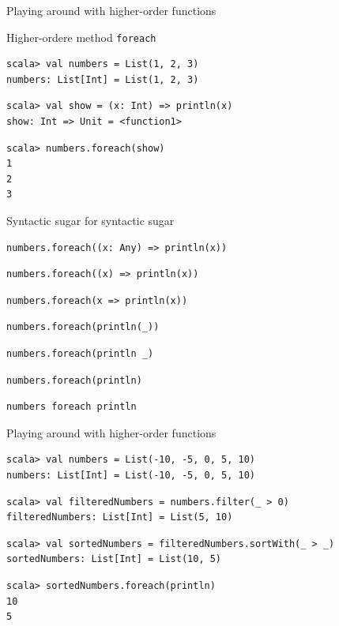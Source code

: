 \begin{frame}[fragile]{Playing around with higher-order functions}
\begin{exampleblock}{Higher-ordere method \lstinline!foreach!}
\begin{lstlisting}
scala> val numbers = List(1, 2, 3)
numbers: List[Int] = List(1, 2, 3)
\end{lstlisting}
\pause
\begin{lstlisting}
scala> val show = (x: Int) => println(x)
show: Int => Unit = <function1>
\end{lstlisting}
\pause
\begin{lstlisting}
scala> numbers.foreach(show)
1
2
3
\end{lstlisting}
\end{exampleblock}
\end{frame}

\begin{frame}[fragile]{Syntactic sugar for syntactic sugar}
\begin{lstlisting}
numbers.foreach((x: Any) => println(x))
\end{lstlisting}
\pause
\begin{lstlisting}
numbers.foreach((x) => println(x))
\end{lstlisting}
\pause
\begin{lstlisting}
numbers.foreach(x => println(x))
\end{lstlisting}
\pause
\begin{lstlisting}
numbers.foreach(println(_))
\end{lstlisting}
\pause
\begin{lstlisting}
numbers.foreach(println _)
\end{lstlisting}
\pause
\begin{lstlisting}
numbers.foreach(println)
\end{lstlisting}
\pause
\begin{lstlisting}
numbers foreach println
\end{lstlisting}
\end{frame}

\begin{frame}[fragile]{Playing around with higher-order functions}
\begin{lstlisting}
scala> val numbers = List(-10, -5, 0, 5, 10)
numbers: List[Int] = List(-10, -5, 0, 5, 10)
\end{lstlisting}
\pause
\begin{lstlisting}
scala> val filteredNumbers = numbers.filter(_ > 0)
filteredNumbers: List[Int] = List(5, 10)
\end{lstlisting}
\pause
\begin{lstlisting}
scala> val sortedNumbers = filteredNumbers.sortWith(_ > _)
sortedNumbers: List[Int] = List(10, 5)
\end{lstlisting}
\pause
\begin{lstlisting}
scala> sortedNumbers.foreach(println)
10
5
\end{lstlisting}
\end{frame}

